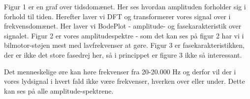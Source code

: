 \documentclass[12pt, letterpaper]{article}
\begin{document}
\begin{figure}[!h]
           \begin{floatrow}
       
           \end{floatrow}
\end{figure}

Figur 1 er en graf over tidsdomænet. Her ses hvordan amplituden forholder sig i forhold til tiden. Herefter laver vi DFT og transformerer vores signal over i frekvensdomænet. Her laver vi BodePlot - amplitude- og fasekarakteristik over signalet. Figur 2 er vores amplitudespektre - som det kan ses på figur 2 har vi i bilmotor-støjen mest med lavfrekvenser at gøre.  
Figur 3 er fasekarakteristikken, der er ikke det store fasedrej her, så i princippet er figure 3 ikke så interessant. 

Det menneskelige øre kan høre frekvenser fra 20-20.000 Hz og derfor vil der i vores lydsignal i hvert fald ikke være frekvenser, hverken over eller under. Dette kan ses på alle amplitude-spektrene. 

\newpage
\end{document}
